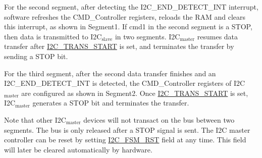 \documentclass[main\_\_EN.tex]{subfiles}
\begin{document}
For the second segment, after detecting the I2C\_END\_DETECT\_INT interrupt, software refreshes the CMD\_Controller registers, reloads the RAM and clears this interrupt, as shown in Segment1. If cmd1 in the second segment is a STOP, then data is transmitted to I2C$_\text{slave}$ in two segments. I2C$_\text{master}$ resumes data transfer after \hyperref[fielddesc:I2CTRANSSTART]{I2C\_TRANS\_START} is set, and terminates the transfer by sending a STOP bit.

For the third segment, after the second data transfer finishes and an I2C\_END\_DETECT\_INT is detected, the CMD\_Controller registers of I2C$_\text{master}$ are configured as shown in Segment2. Once \hyperref[fielddesc:I2CTRANSSTART]{I2C\_TRANS\_START} is set, I2C$_\text{master}$ generates a STOP bit and terminates the transfer.

Note that other I2C$_\text{master}$ devices will not transact on the bus between two segments. The bus is only released after a STOP signal is sent. The I2C master controller can be reset by setting \hyperref[fielddesc:I2CFSMRST]{I2C\_FSM\_RST} field at any time. This field will later be cleared automatically by hardware.
\end{document}
